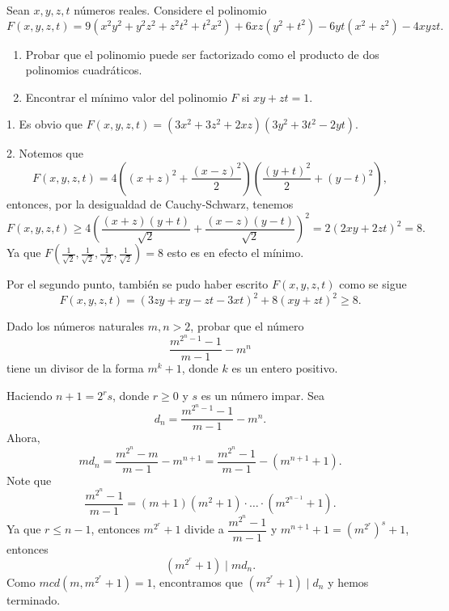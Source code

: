 \begin{example}
    Sean $x, y, z, t$ números reales.
    Considere el polinomio
    \[
        F(x,y,z,t) = 9 (x^2 y^2 + y^2 z^2 + z^2 t^2 + t^2 x^2) + 6xz (y^2 + t^2) - 6yt(x^2 + z^2) - 4 xyz t.
    \]
    \begin{enumerate}
        \item Probar que el polinomio puede ser factorizado como el producto de dos polinomios cuadráticos.
        \item Encontrar el mínimo valor del polinomio $F$ si $xy + zt = 1$.
    \end{enumerate}
\end{example}
\begin{solution}
    1. Es obvio que $F(x, y, z, t) = (3x^2 + 3z^2 + 2xz)(3y^2 + 3t^2 - 2yt).$

    2. Notemos que
    \[
        F(x, y, z, t) = 4 \left((x + z)^2 + \frac{(x - z)^2}{2}\right)\left(\frac{(y + t)^2}{2} + (y - t)^2\right),
    \]
    entonces, por la desigualdad de Cauchy-Schwarz, tenemos
    \[
        F(x, y, z, t) \geq 4 \left( \frac{(x + z)(y + t)}{\sqrt {2}} + \frac{(x - z)(y - t)}{\sqrt {2}} \right)^2 = 2(2xy + 2zt)^2 = 8.
    \]
    Ya que $F\left(\frac{1}{\sqrt {2}}, \frac{1}{\sqrt {2}}, \frac{1}{\sqrt {2}}, \frac{1}{\sqrt {2}}\right) = 8$ esto es en efecto el mínimo.
\end{solution}

\begin{note}
    Por el segundo punto, también se pudo haber escrito $F(x, y, z, t)$ como se sigue
    \[
        F(x, y, z, t) = (3zy + xy - zt - 3xt)^2 + 8(xy + zt)^2 \geq 8.
    \]
\end{note}


\begin{example}
    Dado los números naturales $m,n > 2$, probar que el número
    \[
        \frac{m^{2^n - 1} - 1}{m - 1} - m^n
    \]
    tiene un divisor de la forma $m^k + 1$, donde $k$ es un entero positivo.
\end{example}
\begin{solution}
    Haciendo $n + 1 = 2^r s$, donde $r \geq 0$ y $s$ es un número impar.
    Sea
    \[
        d_n = \frac{m^{2^n - 1} - 1}{m - 1} - m^n.
    \]
    Ahora,
    \[
        m d_n = \frac{m^{2^n} - m}{m - 1} - m^{n + 1} = \frac{m^{2^n} - 1}{m - 1} - \left(m^{n + 1} + 1\right).
    \]
    Note que
    \[
        \frac{m^{2^n} - 1}{m - 1} = (m + 1)(m^2 + 1) \cdot \ldots \cdot (m^{2^{n - 1}} + 1).
    \]
    Ya que $r \leq n - 1$, entonces $m^{2^r} + 1$ divide a $\dfrac{m^{2^n} - 1}{m - 1}$ y $m^{n + 1} + 1 = (m^{2^r})^s + 1$, entonces
    \[
        (m^{2^r} + 1) \mid md_n.
    \]
    Como $mcd (m, m^{2^r} + 1) = 1$, encontramos que $(m^{2^r} + 1) \mid d_n$ y hemos terminado.
\end{solution}

